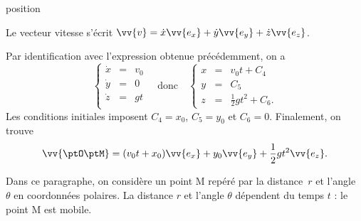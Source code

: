 

\begin{enonce}
	 position
\end{enonce}


\begin{corrige}
Le vecteur vitesse s'écrit $\vv{v}=\dot{x}\vv{e_x}+\dot{y}\vv{e_y}+\dot{z}\vv{e_z}$. 

Par identification avec l'expression obtenue précédemment, on a 
 \[
 \left\{
 \begin{array}{ccc}
 	\dot{x}&=&v_0\\
 	\dot{y}&=&0\\
 	\dot{z}&=&gt\\
 \end{array}
\right.
	\quad\text{donc}\quad
\left\{
\begin{array}{ccc}
	x&=&v_0t+C_4\\
	y&=&C_5\\
	z&=&\frac12 gt^2+C_6.
\end{array}
\right.
 \]
Les conditions initiales imposent $C_4=x_0$, $C_5=y_0$ et $C_6=0$. Finalement, on trouve
\[
\vv{\ptO\ptM}=(v_0 t + x_0) \vv{e_x} + y_0\vv{e_y}+ \frac12 gt^2 \vv{e_z}.
\]
\end{corrige}

\finEntrainement


\newpage



\medskip

                                \initialisationPartieGauche %
Dans ce paragraphe, on considère un point M repéré par la distance~$r$ et l'angle~$\theta$ en coordonnées polaires. 
La distance $r$ et l'angle $\theta$ dépendent du temps $t$ : le point M est mobile.

